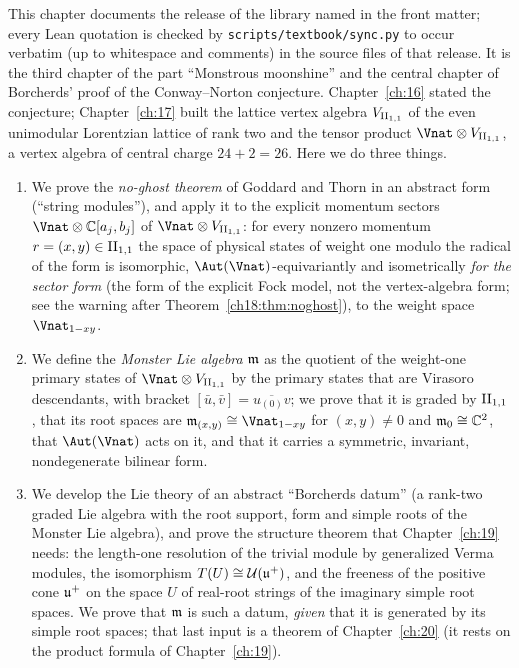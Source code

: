This chapter documents the release of the library named in the front matter; every Lean quotation is checked by
\texttt{scripts/textbook/sync.py} to occur verbatim (up to whitespace and comments) in the source files of that
release.
It is the third chapter of the part ``Monstrous moonshine'' and the central chapter of Borcherds' proof
of the Conway--Norton conjecture.  Chapter~\ref{ch:16} stated the conjecture; Chapter~\ref{ch:17}
built the lattice vertex algebra $V_{\mathrm{II}_{1,1}}$ of the even unimodular Lorentzian lattice of rank two and
the tensor product $\Vnat\otimes V_{\chXVIIIII}$, a vertex algebra of central charge $24+2=26$.  Here we
do three things.
\begin{enumerate}[label=(\Roman*)]
\item We prove the \emph{no-ghost theorem} of Goddard and Thorn in an abstract form (``string
  modules''), and apply it to the explicit momentum sectors $\Vnat\otimes\mathbb C[a_j,b_j]$ of
  $\Vnat\otimes V_{\chXVIIIII}$: for every nonzero momentum $r=(x,y)\in\mathrm{II}_{1,1}$ the space of
  physical states of weight one modulo the radical of the form is isomorphic, $\Aut(\Vnat)$-equivariantly and
  isometrically \emph{for the sector form} (the form of the explicit Fock model, not the vertex-algebra form; see the
  warning after Theorem~\ref{ch18:thm:noghost}), to the weight space $\Vnat_{1-xy}$.
\item We define the \emph{Monster Lie algebra} $\mathfrak{m}$ as the quotient of the weight-one
  primary states of $\Vnat\otimes V_{\chXVIIIII}$ by the primary states that are Virasoro
  descendants, with bracket $[\bar u,\bar v]=\overline{u_{(0)}v}$; we prove that it is graded by
  $\mathrm{II}_{1,1}$, that its root spaces are $\chXVIIIm_{(x,y)}\cong\Vnat_{1-xy}$ for $(x,y)\neq 0$ and
  $\mathfrak{m}_0\cong\mathbb C^2$, that $\Aut(\Vnat)$ acts on it, and that it carries a symmetric,
  invariant, nondegenerate bilinear form.
\item We develop the Lie theory of an abstract ``Borcherds datum'' (a rank-two graded Lie algebra
  with the root support, form and simple roots of the Monster Lie algebra), and prove the structure
  theorem that Chapter~\ref{ch:19} needs: the length-one resolution of the trivial module by
  generalized Verma modules, the isomorphism $T(U)\cong \mathcal U(\mathfrak{u}^+)$, and the freeness of the
  positive cone $\mathfrak{u}^+$ on the space $U$ of real-root strings of the imaginary simple root
  spaces.  We prove that $\mathfrak{m}$ is such a datum, \emph{given} that it is generated by its simple
  root spaces; that last input is a theorem of Chapter~\ref{ch:20} (it rests on the product formula
  of Chapter~\ref{ch:19}).
\end{enumerate}

